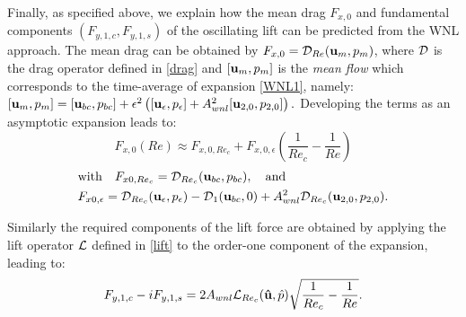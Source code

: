 \documentclass[twocolumn,10pt]{asme2ej}
\newcommand{\be}[1]{ \begin{equation} \label{#1}}
\newcommand{\ee}{\end{equation}}
\begin{document}
Finally, as specified above, we explain how the mean drag $F_{x,0}$ and fundamental components $(F_{y,1,c},F_{y,1,s})$ of the oscillating lift can be predicted from the WNL approach.
The mean drag  can be obtained by $F_{x,0} = {\cal D}_{Re}({\bf u}_m,p_m)$, where ${\cal D}$ is the drag operator defined in \eqref{drag} and 
$[{\bf u}_m,p_m]$ is the {\em mean flow}  
which corresponds to the time-average of expansion  \eqref{WNL1}, namely:
$
[{\bf u}_m,p_m] = [{\bf u}_{bc},p_{bc}] +\epsilon^2 \left( [{\bf u}_\epsilon,p_\epsilon] + A_{wnl}^2 [{\bf u}_{2,0}, p_{2,0} ] \right).
$
Developing the terms as an asymptotic expansion leads to:
\be{drag_cos}
 F_{x,0}(Re) \approx F_{x,0,{Re_c}} +  F_{x,0,\epsilon} \left(\frac{1}{Re_c}-\frac{1}{Re}\right)
\ee 
\begin{equation*}
\begin{aligned}
& \mbox{with} \quad F_{x0,{Re_c}}  = {\cal D}_{Re_c} ({\bf u}_{bc},p_{bc}), \quad \mbox{and}  
\\ 
& F_{x0,\epsilon} = {\cal D}_{Re_c} ({\bf u}_\epsilon, p_\epsilon ) - {\cal D}_{1} ({\bf u}_{bc},0) 
+ A_{wnl}^2 {\cal D}_{Re_c} ({\bf u}_{2,0},p_{2,0}). 
\end{aligned}
\end{equation*}

Similarly the required components of the lift force are obtained by applying the lift operator ${\cal L}$ defined in \eqref{lift} 
to the order-one component of the expansion, leading to:
\be{lift_cos}
F_{y,1,c} - i F_{y,1,s} = 2 A_{wnl} {\cal{L}}_{Re_c}( {\bf \hat{u}},\hat{p} ) \sqrt{\frac{1}{Re_c}-\frac{1}{Re}}.
\ee


\end{document}
